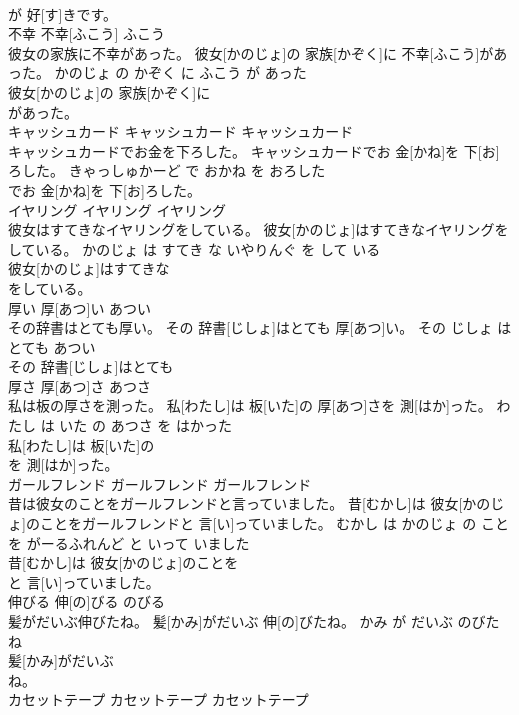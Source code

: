 \documentclass[8pt]{extreport}
\begin{document}
\begin{CJK}{UTF8}{min}
\\	が 好[す]きです。			
\\	不幸	不幸[ふこう]	ふこう	
\\	彼女の家族に不幸があった。	彼女[かのじょ]の 家族[かぞく]に 不幸[ふこう]があった。	かのじょ の かぞく に ふこう が あった	
\\	彼女[かのじょ]の 家族[かぞく]に
\\	があった。			
\\	キャッシュカード	キャッシュカード	キャッシュカード	
\\	キャッシュカードでお金を下ろした。	キャッシュカードでお 金[かね]を 下[お]ろした。	きゃっしゅかーど で おかね を おろした	
\\	でお 金[かね]を 下[お]ろした。			
\\	イヤリング	イヤリング	イヤリング	
\\	彼女はすてきなイヤリングをしている。	彼女[かのじょ]はすてきなイヤリングをしている。	かのじょ は すてき な いやりんぐ を して いる	
\\	彼女[かのじょ]はすてきな
\\	をしている。			
\\	厚い	厚[あつ]い	あつい	
\\	その辞書はとても厚い。	その 辞書[じしょ]はとても 厚[あつ]い。	その じしょ は とても あつい	
\\	その 辞書[じしょ]はとても
\\	厚さ	厚[あつ]さ	あつさ	
\\	私は板の厚さを測った。	私[わたし]は 板[いた]の 厚[あつ]さを 測[はか]った。	わたし は いた の あつさ を はかった	
\\	私[わたし]は 板[いた]の
\\	を 測[はか]った。			
\\	ガールフレンド	ガールフレンド	ガールフレンド	
\\	昔は彼女のことをガールフレンドと言っていました。	昔[むかし]は 彼女[かのじょ]のことをガールフレンドと 言[い]っていました。	むかし は かのじょ の こと を がーるふれんど と いって いました	
\\	昔[むかし]は 彼女[かのじょ]のことを
\\	と 言[い]っていました。			
\\	伸びる	伸[の]びる	のびる	
\\	髪がだいぶ伸びたね。	髪[かみ]がだいぶ 伸[の]びたね。	かみ が だいぶ のびた ね	
\\	髪[かみ]がだいぶ
\\	ね。			
\\	カセットテープ	カセットテープ	カセットテープ	

\end{CJK}
\end{document}
